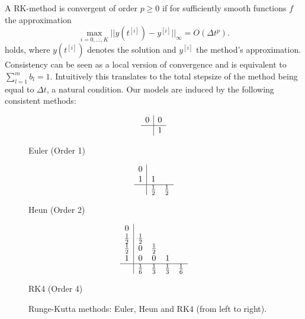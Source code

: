 \documentclass{article}
\begin{document}
A RK-method is convergent of order $p \geq 0$ if for sufficiently smooth functions $f$ the approximation
$$
\max_{i = 0,...,K} ||y(t^{[i]}) - y^{[i]}||_{\infty} = O(\Delta t^{p}).
$$
holds, where $y(t^{[i]})$ denotes the solution and $y^{[i]}$ the method's approximation. Consistency can be seen as a local version of convergence and is equivalent to $\sum_{l=1}^{m} b_l = 1$. Intuitively this translates to the total stepsize of the method being equal to $\Delta t$, a natural condition. Our models are induced by the following consistent methods:

\begin{figure}[h]
\centering
\begin{minipage}{.2\textwidth}
  \centering
  \[
  \begin{array}{c|c}
  0 & 0 \\
  \hline
  & 1
  \end{array}
  \]
  \caption*{Euler (Order 1)}
\end{minipage}
\begin{minipage}{.2\textwidth}
  \centering
  \[
  \begin{array}{c|cc}
  0 & & \\
  1 & 1 &  \\
  \hline
  & \frac{1}{2} & \frac{1}{2}
  \end{array}
  \]
  \caption*{Heun (Order 2)}
\end{minipage}
\begin{minipage}{.2\textwidth}
  \centering
\[
\begin{array}
{c|cccc}
0\\
\frac{1}{2} & \frac{1}{2}\\
\frac{1}{2} &0 &\frac{1}{2} \\
1& 0& 0& 1\\
\hline
& \frac{1}{6} &\frac{1}{3} &\frac{1}{3} &\frac{1}{6}
\end{array}
\]
  \caption*{RK4 (Order 4)}
\end{minipage}
\caption{Runge-Kutta methods: Euler, Heun and RK4 (from left to right).}
\label{figA1}
\end{figure}
\end{document}
